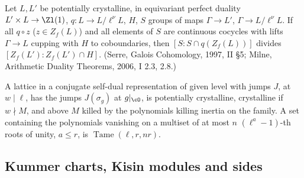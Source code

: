 \begin{fact}
\label{cg-lifting:fact:duality}
Let $L,L'$ be potentially crystalline, in equivariant perfect duality $L'\times L\to\Zl(1)$,
$q\colon L\to L/\ell^\nu L$, $H$, $S$ groups of maps $\Gamma\to L'$, $\Gamma\to L/\ell^\nu L$. If all $q\circ z$ ($z\in Z_f(L)$) and all elements of $S$ are continuous cocycles
with lifts $\Gamma\to L$ cupping with $H$ to coboundaries, then $[S:S\cap q(Z_f(L))]$ divides $[Z_f(L'):Z_f(L')\cap H]$. (Serre, Galois
Cohomology, 1997, II \S5; Milne, Arithmetic Duality Theorems, 2006, I 2.3, 2.8.)
\end{fact}

\begin{lemma}
\label{cg-lifting:lem:local}
A lattice in a conjugate self-dual representation of given level with jumps $J$, at
$w\mid\ell$, has the jumps $J(\sigma_g)$ at $g|_\cO$, is potentially crystalline,
crystalline if $w\nmid M$, and above $M$ killed by the polynomials killing inertia on the family. A set containing the polynomials vanishing
on a multiset of at most $n$ $(\ell^a-1)$-th roots of unity, $a\le r$, is
$\operatorname{Tame}(\ell,r,nr)$.
\end{lemma}

\subsection{Kummer charts, Kisin modules and sides}\label{cg-lifting:sec:charts}

